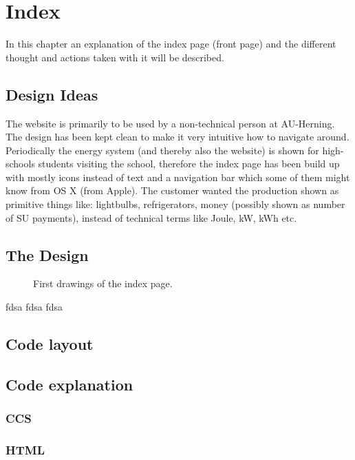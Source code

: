 \newpage
\chapter{Index}
In this chapter an explanation of the index page (front page)  and the different thought and actions taken with it will be described.  
\section{Design Ideas}
The website is primarily to be used by a non-technical person at AU-Herning. The design has been kept clean to make it very intuitive how to navigate around. Periodically the energy system (and thereby also the website) is shown for high-schools students visiting the school, therefore the index page has been build up with mostly icons instead of text and a navigation bar which some of them might know from OS X (from Apple). The customer wanted the production shown as primitive things like: lightbulbs, refrigerators, money (possibly shown as number of SU payments), instead of technical terms like Joule, kW, kWh etc.
\section{The Design}

\begin{figure}
	\center
		\setlength\fboxsep{0pt}
		\setlength\fboxrule{1pt}
   	\caption{First drawings of the index page.}
   	\label{fig:index_page_design}
\end{figure}
fdsa fdsa fdsa
\section{Code layout}

\section{Code explanation}

\subsection{CCS}

\subsection{HTML}